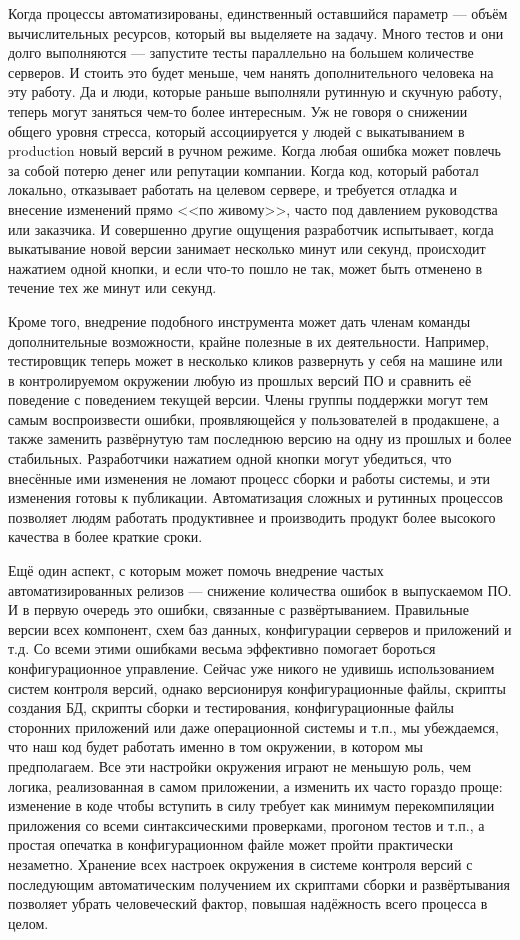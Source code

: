 \documentclass{../../text-style}
\begin{document}
Когда процессы автоматизированы, единственный оставшийся параметр --- объём вычислительных ресурсов, который вы выделяете на задачу. Много тестов и они долго выполняются --- запустите тесты параллельно на большем количестве серверов. И стоить это будет меньше, чем нанять дополнительного человека на эту работу. Да и люди, которые раньше выполняли рутинную и скучную работу, теперь могут заняться чем-то более интересным. Уж не говоря о снижении общего уровня стресса, который ассоциируется у людей с выкатыванием в production новый версий в ручном режиме. Когда любая ошибка может повлечь за собой потерю денег или репутации компании. Когда код, который работал локально, отказывает работать на целевом сервере, и требуется отладка и внесение изменений прямо <<по живому>>, часто под давлением руководства или заказчика. И совершенно другие ощущения разработчик испытывает, когда выкатывание новой версии занимает несколько минут или секунд, происходит нажатием одной кнопки, и если что-то пошло не так, может быть отменено в течение тех же минут или секунд.

Кроме того, внедрение подобного инструмента может дать членам команды дополнительные возможности, крайне полезные в их деятельности. Например, тестировщик теперь может в несколько кликов развернуть у себя на машине или в контролируемом окружении любую из прошлых версий ПО и сравнить её поведение с поведением текущей версии. Члены группы поддержки могут тем самым воспроизвести ошибки, проявляющейся у пользователей в продакшене, а также заменить развёрнутую там последнюю версию на одну из прошлых и более стабильных. Разработчики нажатием одной кнопки могут убедиться, что внесённые ими изменения не ломают процесс сборки и работы системы, и эти изменения готовы к публикации. Автоматизация сложных и рутинных процессов позволяет людям работать продуктивнее и производить продукт более высокого качества в более краткие сроки.

Ещё один аспект, с которым может помочь внедрение частых автоматизированных релизов --- снижение количества ошибок в выпускаемом ПО. И в первую очередь это ошибки, связанные с развёртыванием. Правильные версии всех компонент, схем баз данных, конфигурации серверов и приложений и т.д. Со всеми этими ошибками весьма эффективно помогает бороться конфигурационное управление. Сейчас уже никого не удивишь использованием систем контроля версий, однако версионируя конфигурационные файлы, скрипты создания БД, скрипты сборки и тестирования, конфигурационные файлы сторонних приложений или даже операционной системы и т.п., мы убеждаемся, что наш код будет работать именно в том окружении, в котором мы предполагаем. Все эти настройки окружения играют не меньшую роль, чем логика, реализованная в самом приложении, а изменить их часто гораздо проще: изменение в коде чтобы вступить в силу требует как минимум перекомпиляции приложения со всеми синтаксическими проверками, прогоном тестов и т.п., а простая опечатка в конфигурационном файле может пройти практически незаметно. Хранение всех настроек окружения в системе контроля версий с последующим автоматическим получением их скриптами сборки и развёртывания позволяет убрать человеческий фактор, повышая надёжность всего процесса в целом.
\end{document}
